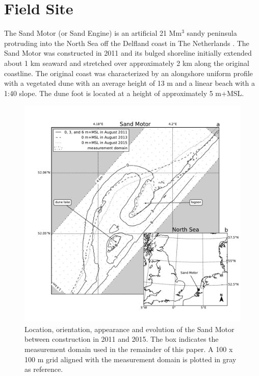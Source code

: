 \section{Field Site}
\label{sec:fieldsite3}

The Sand Motor (or Sand Engine) is an artificial 21 $\mathrm{Mm^3}$
sandy peninsula protruding into the North Sea off the Delfland coast
in The Netherlands \citep[Figure \ref{fig:fieldsite3},][]{Stive2013}.
The Sand Motor was constructed in 2011 and its bulged shoreline
initially extended about 1 km seaward and stretched over approximately
2 km along the original coastline. The original coast was
characterized by an alongshore uniform profile with a vegetated dune
with an average height of 13 m and a linear beach with a 1:40
slope. The dune foot is located at a height of approximately 5 m+MSL.

\begin{figure}
  \centering
  \includegraphics[width=\columnwidth]{../Figures/location_and_evolution}
  \caption{Location, orientation, appearance and evolution of the Sand
    Motor between construction in 2011 and 2015. The box indicates the
    measurement domain used in the remainder of this paper. A 100 x
    100 m grid aligned with the measurement domain is plotted in gray
    as reference.}
  \label{fig:fieldsite3}
\end{figure}


